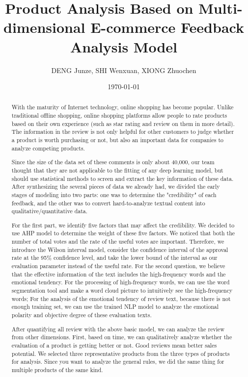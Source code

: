 \documentclass{mcmthesis}
\title{Product Analysis Based on Multi-dimensional E-commerce Feedback Analysis Model}
\author{\small DENG Junze, SHI Wenxuan, XIONG Zhuochen}
\date{\today}
\begin{document}
\begin{abstract}

    With the maturity of Internet technology, online shopping has become popular. Unlike traditional offline shopping, online shopping platforms allow people to rate products based on their own experience (such as star rating and review on them in more detail). The information in the review is not only helpful for other customers to judge whether a product is worth purchasing or not, but also an important data for companies to analyze competing products.
    
    Since the size of the data set of these comments is only about 40,000, our team thought that they are not applicable to the fitting of any deep learning model, but should use statistical methods to screen and extract the key information of these data. After synthesizing the several pieces of data we already had, we divided the early stages of modeling into two parts: one was to determine the "credibility" of each feedback, and the other was to convert hard-to-analyze textual content into qualitative/quantitative data.
    
    For the first part, we identify five factors that may affect the credibility. We decided to use AHP model to determine the weight of these five factors. We noticed that both the number of total votes and the rate of the useful votes are important. Therefore, we introduce the Wilson interval model, consider the confidence interval of the approval rate at the 95\% confidence level, and take the lower bound of the interval as our evaluation parameter instead of the useful rate. For the second question, we believe that the effective information of the text includes the high-frequency words and the emotional tendency. For the processing of high-frequency words, we can use the word segmentation tool and make a word cloud picture to intuitively see the high-frequency words; For the analysis of the emotional tendency of review text, because there is not enough training set, we can use the trained NLP model to analyze the emotional polarity and objective degree of these evaluation texts.
    
    After quantifying all review with the above basic model, we can analyze the review from other dimensions. First, based on time, we can qualitatively analyze whether the evaluation of a product is getting better or not. Good reviews mean better sales potential. We selected three representative products from the three types of products for analysis. Since you want to analyze the general rules, we did the same thing for multiple products of the same kind.
    

\end{abstract}
\end{document}
